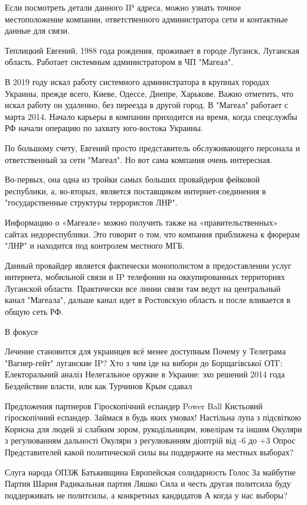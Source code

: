Если посмотреть детали данного IP адреса, можно узнать точное местоположение
компании, ответственного администратора сети и контактные данные для связи.

Теплицкий Евгений, 1988 года рождения, проживает в городе Луганск, Луганская
область. Работает системным администратором в ЧП "Магеал".

В 2019 году искал работу системного администратора в крупных городах Украины,
прежде всего, Киеве, Одессе, Днепре, Харькове. Важно отметить, что искал работу
он удаленно, без переезда в другой город. В "Магеал" работает с марта 2014.
Начало карьеры в компании приходится на время, когда спецслужбы РФ начали
операцию по захвату юго-востока Украины.

По большому счету, Евгений просто представитель обслуживающего персонала и
ответственный за сети "Магеал". Но вот сама компания очень интересная.

Во-первых, она одна из тройки самых больших провайдеров фейковой республики, а,
во-вторых, является поставщиком интернет-соединения в "государственные
структуры террористов ЛНР".

Информацию о «Магеале» можно получить также на «правительственных» сайтах
недореспублики. Это говорит о том, что компания приближена к фюрерам "ЛНР" и
находится под контролем местного МГБ.

Данный провайдер является фактически монополистом в предоставлении услуг
интернета, мобильной связи и IP телефонии на оккупированных территориях
Луганской области. Практически все линии связи там ведут на центральный канал
"Магеала", дальше канал идет в Ростовскую область и после вливается в общую
сеть РФ.


В фокусе

    Лечение становится для украинцев всё менее доступным
    Почему у Телеграма "Вагнер-гейт" луганские IP?	
    Хто з чим іде на вибори до Борщагівської ОТГ: Електоральний аналіз	
    Нелегальное оружие в Украине: эхо решений 2014 года	
    ﻿Бездействие власти, или как Турчинов Крым сдавал	

Предложения партнеров
Гіроскопічний еспандер Power Ball
Кистьовий гіроскопічний еспандер. Займася в будь яких умовах!
Настільна лупа з підсвіткою
Корисна для людей зі слабким зором, рукодільницям, ювелірам та іншим
Окуляри з регулюванням дальності
Окуляри з регулюванням діоптрій від -6 до +3
Опрос
Представителей какой политической силы вы поддержите на местных выборах?

    Слуга народа
    ОПЗЖ
    Батькивщина
    Европейская солидарность
    Голос
    За майбутне
    Партия Шария
    Радикальная партия Ляшко
    Сила и честь
    другая политсила
    буду поддерживать не политсилы, а конкретных кандидатов
    А когда у нас выборы?

